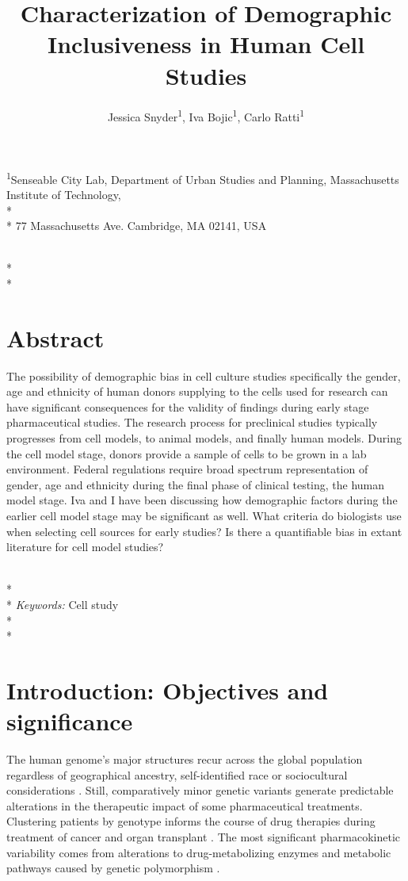 \documentclass[10pt]{article}
\title{Characterization of Demographic Inclusiveness in Human Cell Studies}
\author{Jessica Snyder\textsuperscript{1}, Iva Bojic\textsuperscript{1}, Carlo Ratti\textsuperscript{1}}
\begin{document}
 \maketitle
  
   \begin{center} \textsuperscript{1}Senseable City Lab, Department of Urban Studies and Planning, Massachusetts Institute of Technology, \\* \\* 77 Massachusetts Ave. Cambridge, MA 02141, USA  \end{center} \\* \\* 
  
\hline
\section*{Abstract}
The possibility of demographic bias in cell culture studies specifically the gender, age and ethnicity of human donors supplying to the cells used for research can have significant consequences for the validity of findings during early stage pharmaceutical studies. The research process for preclinical studies typically progresses from cell models, to animal models, and finally human models. During the cell model stage, donors provide a sample of cells to be grown in a lab environment. Federal regulations require broad spectrum representation of gender, age and ethnicity during the final phase of clinical testing, the human model stage. Iva and I have been discussing how demographic factors during the earlier cell model stage may be significant as well. What criteria do biologists use when selecting cell sources for early studies? Is there a quantifiable bias in extant literature for cell model studies? 

\\* \\* \textit{Keywords:} Cell study \\* \\*  \hline


\section{Introduction: Objectives and significance}

The human genome's major structures recur across the global population regardless of geographical ancestry, self-identified race or sociocultural considerations \cite{xie2001molecular, cooper2003race}. Still, comparatively minor genetic variants generate predictable  alterations in the therapeutic impact of some pharmaceutical treatments. Clustering patients by genotype informs the course of drug therapies during treatment of cancer and organ transplant \cite{krynetski2000genetic, higashi2002association}. The most significant pharmacokinetic variability comes from alterations to drug-metabolizing enzymes and metabolic pathways caused by genetic polymorphism \cite{bjornsson2003conduct, naito1998ethnic}. 
\end{document}
